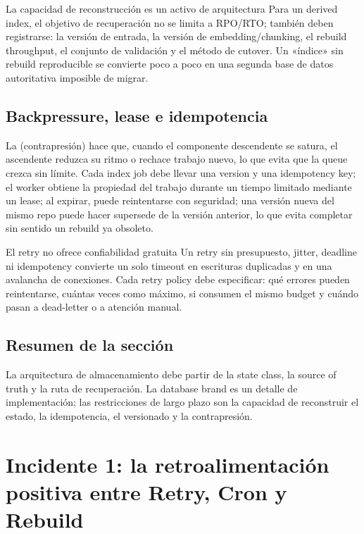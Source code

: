 \documentclass[a4paper]{article}
\begin{document}
\begin{importantbox}{La capacidad de reconstrucción es un activo de arquitectura}
Para un derived index, el objetivo de recuperación no se limita a RPO/RTO; también deben registrarse: la versión de entrada, la versión de embedding/chunking, el rebuild throughput, el conjunto de validación y el método de cutover. Un «índice» sin rebuild reproducible se convierte poco a poco en una segunda base de datos autoritativa imposible de migrar.
\end{importantbox}

\subsection{Backpressure, lease e idempotencia}

La  (contrapresión) hace que, cuando el componente descendente se satura, el ascendente reduzca su ritmo o rechace trabajo nuevo, lo que evita que la queue crezca sin límite. Cada index job debe llevar una version y una idempotency key; el worker obtiene la propiedad del trabajo durante un tiempo limitado mediante un lease; al expirar, puede reintentarse con seguridad; una versión nueva del mismo repo puede hacer supersede de la versión anterior, lo que evita completar sin sentido un rebuild ya obsoleto.

\begin{warningbox}{El retry no ofrece confiabilidad gratuita}
Un retry sin presupuesto, jitter, deadline ni idempotency convierte un solo timeout en escrituras duplicadas y en una avalancha de conexiones. Cada retry policy debe especificar: qué errores pueden reintentarse, cuántas veces como máximo, si consumen el mismo budget y cuándo pasan a dead-letter o a atención manual.
\end{warningbox}

\subsection{Resumen de la sección}

La arquitectura de almacenamiento debe partir de la state class, la source of truth y la ruta de recuperación. La database brand es un detalle de implementación; las restricciones de largo plazo son la capacidad de reconstruir el estado, la idempotencia, el versionado y la contrapresión.
\section{Incidente 1: la retroalimentación positiva entre Retry, Cron y Rebuild}
\end{document}
